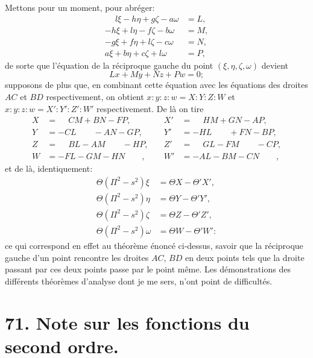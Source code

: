 \documentclass[11pt,a4paper]{article}
\theoremstyle{definition}
\begin{document}
\newpage

\setcounter{page}{420}

Mettons pour un moment, pour abr\'{e}ger:
\begin{align*}
\phantom{-}l\xi - h\eta + g\zeta - a\omega &= L, \\
-h\xi + l\eta - f\zeta - b\omega &= M, \\
-g\xi + f\eta + l\zeta - c\omega &= N, \\
a\xi + b\eta + c\zeta + l\omega &= P,
\end{align*}
de sorte que l'\'{e}quation de la r\'{e}ciproque gauche du point $(\xi, \eta, \zeta, \omega)$ devient
\[
Lx + My + Nz + Pw = 0;
\]
supposons de plus que, en combinant cette \'{e}quation avec les \'{e}quations des droites $AC$ et $BD$ respectivement, on obtient $x:y:z:w = X:Y:Z:W$ et $x:y:z:w = X':Y':Z':W'$ respectivement. De l\`{a} on tire
\begin{align*}
X &= \phantom{-}CM + BN - FP, &\quad X' &= \phantom{-}HM + GN - AP, \\
Y &= -CL \qquad - AN - GP, &\quad Y' &= -HL \qquad + FN - BP, \\
Z &= \phantom{-}BL - AM \qquad - HP, &\quad Z' &= \phantom{-}GL - FM \qquad - CP, \\
W &= -FL - GM - HN \qquad, &\quad W' &= -AL - BM - CN \qquad,
\end{align*}
et de l\`{a}, identiquement:
\begin{align*}
\Theta(\Pi^{2} - s^{2})\xi &= \Theta X - \Theta' X', \\
\Theta(\Pi^{2} - s^{2})\eta &= \Theta Y - \Theta' Y', \\
\Theta(\Pi^{2} - s^{2})\zeta &= \Theta Z - \Theta' Z', \\
\Theta(\Pi^{2} - s^{2})\omega &= \Theta W - \Theta' W':
\end{align*}
ce qui correspond en effet au th\'{e}or\`{e}me \'{e}nonc\'{e} ci-dessus, savoir que la r\'{e}ciproque gauche d'un point rencontre les droites $AC$, $BD$ en deux points tels que la droite passant par ces deux points passe par le point m\^{e}me. Les d\'{e}monstrations des diff\'{e}rents th\'{e}or\`{e}mes d'analyse dont je me sers, n'ont point de difficult\'{e}s.



\newpage
\section*{71. Note sur les fonctions du second ordre.}
\end{document}
